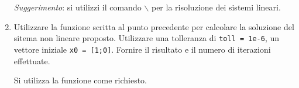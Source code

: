 \begin{enumerate}
	\emph{Suggerimento}: si utilizzi il comando $\backslash$ per la risoluzione dei sistemi lineari.
	
	
	
	
	\item Utilizzare la funzione scritta al punto precedente per calcolare la soluzione del sitema non lineare proposto. Utilizzare una tolleranza di \texttt{toll = 1e-6}, un vettore iniziale \texttt{x0 = [1;0]}. Fornire il risultato e il numero di iterazioni effettuate.
	
	Si utilizza la funzione come richiesto.
	
	
\end{enumerate}